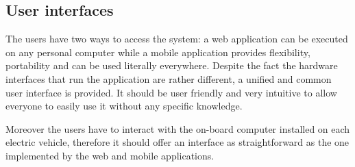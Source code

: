 \subsection{User interfaces}
The users have two ways to access the system: a web application can be executed on any personal computer while a mobile application provides flexibility, portability and can be used literally everywhere. Despite the fact the hardware interfaces that run the application are rather different, a unified and common user interface is provided. It should be user friendly and very intuitive to allow everyone to easily use it without any specific knowledge.

Moreover the users have to interact with the on-board computer installed on each electric vehicle, therefore it should offer an interface as straightforward as the one implemented by the web and mobile applications.